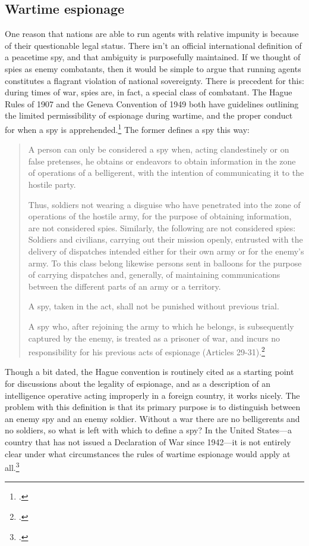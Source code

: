 \documentclass{memoir}
\begin{document}
\begin{refsegment}
\subsection{Wartime espionage}
One reason that nations are able to run agents with relative impunity is because of their questionable legal status. There isn't an official international definition of a peacetime spy, and that ambiguity is purposefully maintained. If we thought of spies as enemy combatants, then it would be simple to argue that running agents constitutes a flagrant violation of national sovereignty. There is precedent for this: during times of war, spies are, in fact, a special class of combatant. The Hague Rules of 1907 and the Geneva Convention of 1949 both have guidelines outlining the limited permissibility of espionage during wartime, and the proper conduct for when a spy is apprehended.\footcite[p.~652]{beim_enforcing_2018} The former defines a spy this way:

\begin{quote}
A person can only be considered a spy when, acting clandestinely or on false pretenses, he obtains or endeavors to obtain information in the zone of operations of a belligerent, with the intention of communicating it to the hostile party.

Thus, soldiers not wearing a disguise who have penetrated into the zone of operations of the hostile army, for the purpose of obtaining information, are not considered spies. Similarly, the following are not considered spies: Soldiers and civilians, carrying out their mission openly, entrusted with the delivery of dispatches intended either for their own army or for the enemy's army. To this class belong likewise persons sent in balloons for the purpose of carrying dispatches and, generally, of maintaining communications between the different parts of an army or a territory.

A spy, taken in the act, shall not be punished without previous trial.

A spy who, after rejoining the army to which he belongs, is subsequently captured by the enemy, is treated as a prisoner of war, and incurs no responsibility for his previous acts of espionage (Articles 29-31).\footcite{noauthor_hague_1907}
\end{quote}

Though a bit dated, the Hague convention is routinely cited as a starting point for discussions about the legality of espionage, and as a description of an intelligence operative acting improperly in a foreign country, it works nicely. The problem with this definition is that its primary purpose is to distinguish between an enemy spy and an enemy soldier. Without a war there are no belligerents and no soldiers, so what is left with which to define a spy? In the United States---a country that has not issued a Declaration of War since 1942---it is not entirely clear under what circumstances the rules of wartime espionage would apply at all.\footcite{ncc_staff_when_2018}


\end{refsegment}
\end{document}
